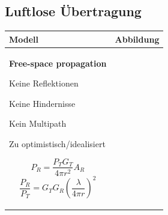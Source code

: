 \newpage

\subsection{Luftlose Übertragung }
\begin{tabular}{|l|c|}
\hline
\textbf{Modell}
    & \textbf{Abbildung}\\
\hline
\hline
\parbox{10cm}{
    \textbf{Free-space propagation } \\
    \begin{minipage}{6cm}
	    \begin{liste}
	        \item Keine Reflektionen
	        \item Keine Hindernisse
	        \item Kein Multipath
	        \item Zu optimistisch/idealisiert
	    \end{liste}        
    \end{minipage}
    \begin{minipage}{3cm}
        $$ P_R= \frac{P_TG_T}{4\pi r^2} A_R $$
        $$ \frac{P_R}{P_T} = G_TG_R \left(\frac{\lambda}{4\pi r}\right)^2  $$
    \end{minipage}

}
\end{tabular}
